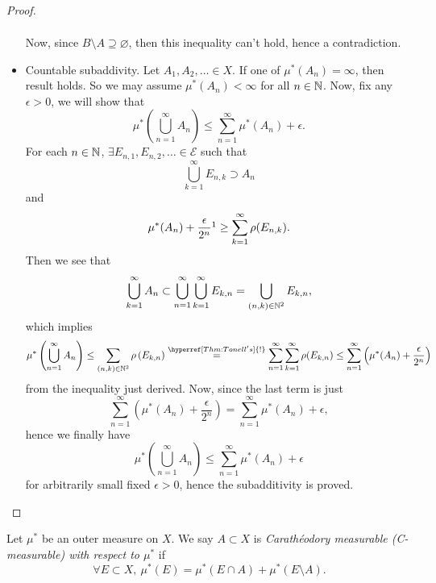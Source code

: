 \begin{proof}
\begin{itemize}
\[\begin{split}
			      \end{split}
		      \]
		      Now, since \(B\setminus A\supseteq \varnothing \), then this inequality can't hold, hence a contradiction\conta.
		\item Countable subaddivity. Let \(A_1, A_2, \ldots \in X \). If one of \(\mu^{*} (A_{n}) = \infty \), then result holds.
		      So we may assume \(\mu^{*} (A_n)<\infty \) for all \(n\in \mathbb{\MakeUppercase{N}} \). Now, fix any \(\epsilon >0\),
		      we will show that
		      \[
			      \mu^{*} \left(\bigcup\limits_{n=1}^{\infty} A_n\right)\leq \sum\limits_{n=1}^{\infty} \mu^{*} (A_n)+\epsilon.
		      \]
		      For each \(n\in\mathbb{\MakeUppercase{N}} \), \(\exists E_{n, 1}, E_{n, 2}, \ldots \in \mathcal{E}\) such that
		      \[
			      \bigcup\limits_{k=1}^{\infty} E_{n, k}\supset A_n
		      \]
		      and
		      \[
			      \mu^{*} (A_n)+\frac{\epsilon}{2^n}\footnotemark \geq \sum\limits_{k=1}^{\infty} \rho(E_{n, k}).
		      \]
		      Then we see that
		      \[
			      \bigcup\limits_{k=1}^{\infty} A_n \subset \bigcup\limits_{n=1}^{\infty} \bigcup\limits_{k=1}^{\infty} E_{k, n} = \bigcup\limits_{(n, k)\in\mathbb{\MakeUppercase{N}} ^2} E_{k, n},
		      \]
		      which implies
		      \[
			      \mu^{*} \left(\bigcup\limits_{n=1}^{\infty} A_{n}\right) \leq \sum\limits_{(n, k)\in\mathbb{\MakeUppercase{N}} ^2} \rho\left(E_{k, n}\right) \overset{\hyperref[Thm:Tonell's]{\text{!}}}{=} \sum\limits_{n=1}^{\infty} \sum\limits_{k=1}^{\infty} \rho(E_{k, n})\leq \sum\limits_{n=1}^{\infty} \left(\mu^{*} (A_n) + \frac{\epsilon}{2^n}\right)
		      \]
		      from the inequality just derived. Now, since the last term is just
		      \[
			      \sum\limits_{n=1}^{\infty} \left(\mu^{*} (A_n) + \frac{\epsilon}{2^n}\right) = \sum\limits_{n=1}^{\infty} \mu^{*} (A_n)+\epsilon,
		      \]
		      hence we finally have
		      \[
			      \mu^{*} \left(\bigcup\limits_{n=1}^{\infty} A_{n}\right)\leq \sum\limits_{n=1}^{\infty} \mu^{*} (A_n)+\epsilon
		      \]
		      for arbitrarily small fixed \(\epsilon >0\), hence the subadditivity is proved.
	\end{itemize}
\end{proof}

\begin{definition}
	Let \(\mu^{*} \) be an outer measure on \(X\). We say \(A\subset X\) is \emph{Carathéodory measurable (C-measurable) with respect to \(\mu^{*} \)} if
	\[
		\forall E\subset X,\ \mu^{*} (E) = \mu^{*} \left(E\cap A\right) + \mu^{*} \left(E\setminus A\right).
	\]
\end{definition}

